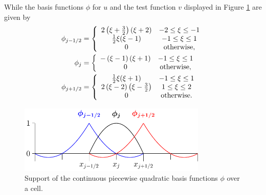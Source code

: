 While the basis functions $\phi$ for $u$ and the test function $v$ displayed in Figure \ref{fig:P2ContBasisAPP} are given by
\begin{subequations}
	\label{eqn:App1:PhiDef}
\begin{align}
\phi_{j-1/2} &= \left\lbrace \begin{array}{c c}
2 \left(\xi + \frac{3}{2}\right)\left(\xi + 2\right) & -2 \le \xi \le -1\\
\frac{1}{2}\xi(\xi - 1) & -1 \le \xi \le 1\\
0 & \text{otherwise} ,\end{array} \right.  \\
\phi_{j} &= \left\lbrace \begin{array}{c c}
-\left(\xi - 1\right)\left(\xi + 1\right) & -1 \le \xi \le 1\\
0 & \text{otherwise},
\end{array} \right.  \\ 
\phi_{j+1/2} &= \left\lbrace \begin{array}{c c}
\frac{1}{2}\xi(\xi + 1) & -1 \le \xi \le 1\\
2\left(\xi - 2\right)\left(\xi - \frac{3}{2} \right) & 1 \le \xi \le 2\\
0 & \text{otherwise}.
\end{array} \right. \\ 
\end{align}
\end{subequations}
\begin{figure}
	\centering
	\includegraphics[width=0.8\textwidth]{./chp3/figures/P2.pdf}
	\caption{Support of the continuous piecewise quadratic basis functions $\phi$ over a cell.}
	\label{fig:P2ContBasisAPP}
\end{figure}

